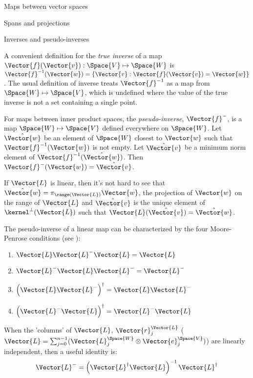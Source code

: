 \begin{plSection}{Maps between vector spaces}
\begin{plSection}{Spans and projections}
\end{plSection}%
\begin{plSection}{Inverses and pseudo-inverses}
\label{sec:Inverses-and-pseudo-inverses}

A convenient definition for the {\it true inverse}
of a map $\Vector{f}(\Vector{v}):\Space{V} \mapsto \Space{W}$ is
$\Vector{f}^{-1}(\Vector{w}) = 
\{ \Vector{v} : \Vector{f}(\Vector{v}) = \Vector{w} \}$.
The usual definition of inverse treats $\Vector{f}^{-1}$
as a map from $\Space{W} \mapsto \Space{V}$,
which is undefined where the value of the true
inverse is not a set containing a single point.

For maps between inner product spaces,
the {\it pseudo-inverse}, $\Vector{f}^{-}$, 
is a map $\Space{W} \mapsto \Space{V}$
defined everywhere on $\Space{W}$.
Let $\hat{\Vector{w}}$ be an element of $\Space{W}$ closest to 
$\Vector{w}$
such that $\Vector{f}^{-1}(\Vector{w})$ is not empty.
Let $\hat{\Vector{v}}$ be a minimum norm element of 
$\Vector{f}^{-1}(\hat{\Vector{w}})$.
Then $\Vector{f}^{-}(\Vector{w}) = \hat{\Vector{v}}$.

If $\Vector{L}$ is linear, then it's not hard to see that
$\hat{\Vector{w}} = \pi_{\range(\Vector{L})} \Vector{w}$, 
the projection of $\Vector{w}$
on the range of $\Vector{L}$
and
$\hat{\Vector{v}}$ is the unique element of 
$\kernel^{\perp}(\Vector{L})$
such that $\Vector{L}(\hat{\Vector{v}}) = \hat{\Vector{w}}$.

The pseudo-inverse of a linear map can be characterized
by the four Moore-Penrose conditions
(see ):
\begin{enumerate}
\item $\Vector{L} \Vector{L}^{-} \Vector{L} = \Vector{L}$
\item $\Vector{L}^{-} \Vector{L} \Vector{L}^{-} = \Vector{L}^{-}$
\item $\left( \Vector{L} \Vector{L}^{-} \right)^{\dagger} 
= \Vector{L} \Vector{L}^{-}$
\item $\left( \Vector{L}^{-} \Vector{L} \right)^{\dagger}
 = \Vector{L}^{-} \Vector{L}$
\end{enumerate}

When the 'columns' of $\Vector{L}$, $\Vector{r}_j^{\Vector{L}}$
($\Vector{L} = \sum_{j=0}^{n-1} 
( \Vector{L}_j^{\Space{W}} \otimes \Vector{e}_j^{\Space{V}} )$)
are linearly independent,
then a useful identity is:
\begin{equation}
\label{eq:full-rank-pseudo-inverse}
\Vector{L}^{-} = 
\left( \Vector{L}^{\dagger} \Vector{L} \right)^{-1} 
\Vector{L}^{\dagger}
\end{equation}


\end{plSection}
\end{plSection}
